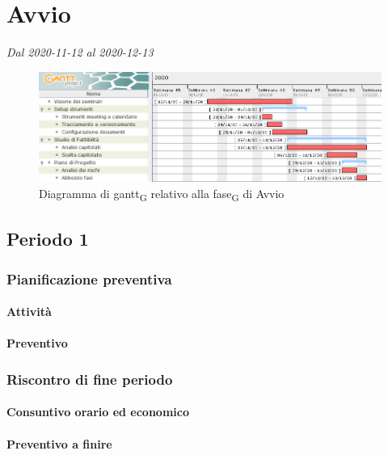 \section{Avvio}
\textit{Dal 2020-11-12 al 2020-12-13}

\begin{figure}[H]
	\centering
	\includegraphics[scale=0.62]{res/images/01_gantt_avvio.png}
	\caption{Diagramma di gantt\textsubscript{G} relativo alla fase\textsubscript{G} di Avvio}
\end{figure}



\subsection{Periodo 1}

\subsubsection{Pianificazione preventiva}


\paragraph{Attività}

\planningTable{
	
}



\paragraph{Preventivo}

\smallPreventivoTable{
	
}

\subsubsection{Riscontro di fine periodo}


\paragraph{Consuntivo orario ed economico}


\paragraph{Preventivo a finire}

\pafTable{
	
}

